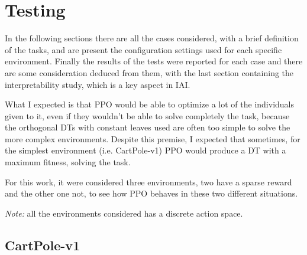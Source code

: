 \chapter{Testing}
\label{cha:400}
In the following sections there are all the cases considered, with a brief definition of the tasks, and are present the configuration settings used for each specific environment. Finally the results of the tests were reported for each case and there are some consideration deduced from them, with the last section containing the interpretability study, which is a key aspect in IAI.

What I expected is that PPO would be able to optimize a lot of the individuals given to it, even if they wouldn't be able to solve completely the task, because the orthogonal DTs with constant leaves used are often too simple to solve the more complex environments. Despite this premise, I expected that sometimes, for the simplest environment (i.e. CartPole-v1) PPO would produce a DT with a maximum fitness, solving the task.

For this work, it were considered three environments, two have a sparse reward and the other one not, to see how PPO behaves in these two different situations.

\textit{Note:} all the environments considered has a discrete action space.


\section{CartPole-v1}
\label{sec:410}

